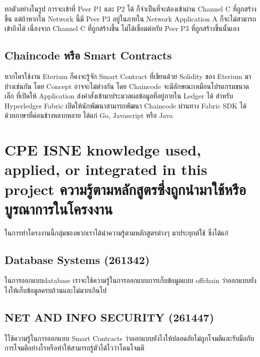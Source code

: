 ยกตัวอย่างในรูป การจะเข้าที่ Peer P1 และ P2 ได้ ก็จำเป็นที่จะต้องเข้าผ่าน Channel C ที่ถูกสร้างขึ้น แต่ถ้าหากใน Network นี้มี Peer P3 อยู่ในภายใน Network Application A ก็จะไม่สามารถเข้าถึงได้ เนื่องจาก Channel C ที่ถูกสร้างขึ้น ไม่ได้เชื่อมต่อกับ Peer P3 ที่ถูกสร้างขึ้นนั้นเอง

\subsection{Chaincode หรือ Smart Contracts}
\cite{Hyperledger_a} 
หากใครใช้งาน Eterium ก็คงจะรู้จัก Smart Contract ที่เขียนด้วย Solidity ของ Eterium มาบ้างเช่นกัน โดย Concept อาจจะไม่ต่างกัน โดย Chaincode จะมีลักษณะเหมือนโปรแกรมขนาดเล็ก ที่เปิดให้ Application ส่งคำสั่งเข้ามาประมวลผลข้อมูลที่อยู่ภายใน Ledger ได้ สำหรับ Hyperledger Fabric เปิดให้นักพัฒนาสามารถพัฒนา Chaincode ผ่านทาง Fabric SDK ได้ด้วยภาษาที่ค่อนข้างหลากหลาย ได้แก่ Go, Javascript หรือ Java

\section{\ifenglish%
\ifcpe CPE \else ISNE \fi knowledge used, applied, or integrated in this project
\else%
ความรู้ตามหลักสูตรซึ่งถูกนำมาใช้หรือบูรณาการในโครงงาน
\fi
}
\enskip \enskip \enskip \enskip \enskip ในการทำโครงงานนี้กลุ่มของพวกเราได้นำความรู้ตามหลักสูตรต่างๆ มาประยุกต์ใช้ ซึ่งได้แก่
\enskip \enskip \enskip \enskip \enskip 
\subsection{Database Systems (261342) }
ในการออกแบบdatabase เราจะใช้ความรู้ในการออกแบบการเก็บข้อมูลแบบ offchain ว่าออกแบบยังไงให้เก็บข้อมูลครบถ้วนและไม่มากเกินไป

\subsection{NET AND INFO SECURITY (261447) }
ใใช้ความรู้ในการออกแบบ Smart Contracts ว่าออกแบบยังไงให้ปลอดภัยไม่ถูกโจมตีและรับมือกับการโจมตีอย่างไรหรือทำให้สามารถรู้ตัวได้ไวว่าโดนโจมตี







